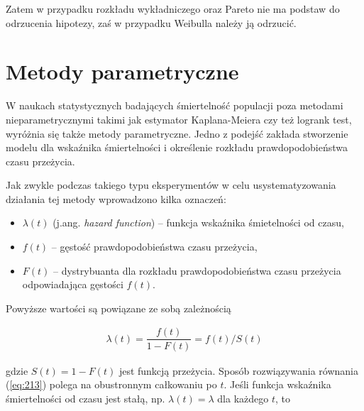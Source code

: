 \documentclass[licencjacka]{pwr_wmat_praca_dyplomowa}
\theoremstyle{plain}
\numberwithin{theorem}{chapter}
\newtheorem{lemma}[theorem]{Lemat}
\theoremstyle{definition}
\numberwithin{theorem}{chapter}
\newtheorem{definition}[theorem]{Definicja}
\begin{document}
Zatem w przypadku rozkładu wykładniczego oraz Pareto nie ma podstaw do odrzucenia hipotezy, zaś w przypadku Weibulla należy ją odrzucić.

	





\section{Metody parametryczne}
W naukach statystycznych badających śmiertelność populacji poza metodami nieparametrycznymi takimi jak estymator Kaplana-Meiera czy też logrank test, wyróżnia się także metody parametryczne. Jedno z podejść zakłada stworzenie modelu dla wskaźnika śmiertelności i określenie rozkładu prawdopodobieństwa czasu przeżycia.

Jak zwykle podczas takiego typu eksperymentów w celu usystematyzowania działania tej metody wprowadzono kilka oznaczeń:
\begin{itemize}
	\item $\lambda (t)$ (j.ang. \textit{hazard function}) -- funkcja wskaźnika śmietelności od czasu,
	\item $f(t)$ -- gęstość prawdopodobieństwa czasu przeżycia, 
	\item $F(t)$ -- dystrybuanta dla rozkładu prawdopodobieństwa czasu przeżycia odpowiadająca gęstości $f(t)$.
	
\end{itemize}
 
Powyższe wartości są powiązane ze sobą zależnością \cite{smimr}

\begin{align}
\lambda (t)=\dfrac{f(t)}{1-F(t)}= f(t)/ S(t) \label{eq:213}
\end{align}

\noindent gdzie $S(t)=1-F(t)$ jest funkcją przeżycia. Sposób rozwiązywania równania (\ref{eq:213}) polega na obustronnym całkowaniu po $t$.
Jeśli funkcja wskaźnika śmiertelności od czasu jest stałą, np. $\lambda (t)=\lambda$ dla każdego $t$, to
\end{document}
